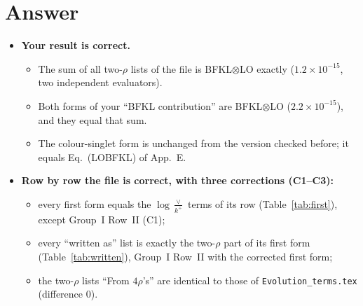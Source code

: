 \documentclass[10pt]{article}
\newcommand{\LV}{\log\frac{\vee}{k^+}}
\begin{document}
\section{Answer}
\begin{itemize}
\item \textbf{Your result is correct.}
  \begin{itemize}
  \item The sum of all two-$\rho$ lists of the file is BFKL$\otimes$LO exactly ($1.2\times10^{-15}$, two independent evaluators).
  \item Both forms of your ``BFKL contribution'' are BFKL$\otimes$LO ($2.2\times10^{-15}$), and they equal that sum.
  \item The colour-singlet form is unchanged from the version checked before; it equals Eq.\ (LOBFKL) of App.~E.
  \end{itemize}
\item \textbf{Row by row the file is correct, with three corrections (C1--C3):}
  \begin{itemize}
  \item every first form equals the $\LV$ terms of its row (Table~\ref{tab:first}), except Group~I Row~II (C1);
  \item every ``written as'' list is exactly the two-$\rho$ part of its first form (Table~\ref{tab:written}), Group~I Row~II with the corrected first form;
  \item the two-$\rho$ lists ``From $4\rho$'s'' are identical to those of \texttt{Evolution\_terms.tex} (difference $0$).
  \end{itemize}
\end{itemize}
\end{document}
